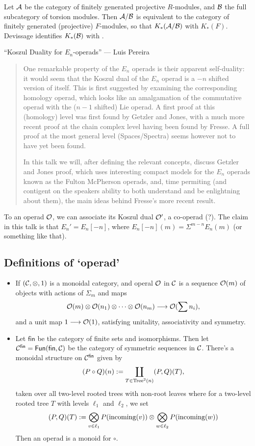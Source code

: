 \begin{InnaKTheory}
 Let $\mathcal{A}$ be the category of finitely generated projective $R$-modules, and $\mathcal{B}$ the full subcategory of torsion modules. Then $\mathcal{A}/\mathcal{B}$ is equivalent to the category of finitely generated (projective) $F$-modules, so that $K_*(\mathcal{A}/\mathcal{B})$ with $K_*(F)$. Devissage identifies $K_*(\mathcal{B})$ with .






\pagebreak
\end{InnaKTheory}
\begin{LuisKoszulDuality}
\KanSemResponse
{``Koszul Duality for $E_n$-operads'' --- Luis Pereira}
\begin{abstract}
One remarkable property of the $E_n$ operads is their apparent self-duality: it would seem that the Koszul dual of the $E_n$ operad is a $-n$ shifted version of itself. This is first suggested by examining the corresponding homology operad, which looks like an amalgamation of the commutative operad with the ($n-1$ shifted) Lie operad. A first proof at this (homology) level was first found by Getzler and Jones, with a much more recent proof at the chain complex level having been found by Fresse. A full proof at the most general level (Spaces/Spectra) seems however not to have yet been found.

 
In this talk we will, after defining the relevant concepts, discuss Getzler and Jones proof, which uses interesting compact models for the $E_n$ operads known as the Fulton McPherson operads, and, time permiting (and contigent on the speakers ability to both understand and be enlightning about them), the main ideas behind Fresse's more recent result.
\end{abstract}
To an operad $\mathcal{O}$, we can associate its Koszul dual $\mathcal{O}'$, a co-operad (?). The claim in this talk is that $E_n'=E_n[-n]$, where $E_n[-n](m)=\Sigma^{m-n}E_n(m)$ (or something like that).
\subsection*{Definitions of `operad'}
\begin{itemize}\squishlist
\item If $(\mathcal{C},\otimes,1)$ is a monoidal category, and operal $\mathcal{O}$ in $\mathcal{C}$ is a sequence $\mathcal{O}(m)$ of objects with actions of $\Sigma_m$ and maps
\[\mathcal{O}(m)\otimes\mathcal{O}(n_1)\otimes\cdots\otimes\mathcal{O}(n_m)\longrightarrow\mathcal{O}(\sum n_i),\]
and a unit map $1\longrightarrow\mathcal{O}(1)$, satisfying unitality, associativity and symmetry.
\item 
Let $\mathsf{fin}$ be the category of finite sets and isomorphisms. Then let $\mathcal{C}^{\mathsf{fin}}=\operatorname{{\mathsf{Fun}}}(\mathsf{fin},\mathcal{C})$ be the category of symmetric sequences in $\mathcal{C}$. There's a monoidal structure on $\mathcal{C}^{\mathsf{fin}}$ given by
\[(P\circ Q)(n):=\coprod_{T\in\textup{Tree}^2(n)}(P,Q)(T),\]
taken over all two-level rooted trees with non-root leaves 
where for a two-level rooted tree $T$ with levels $\ell_1$ and $\ell_2$, we set \[(P,Q)(T):=\bigotimes_{v\in\ell_1}P(\textup{incoming}(v))\otimes\bigotimes_{w\in\ell_2}P(\textup{incoming}(w))\]
Then an operad is a monoid for $\circ$.


\end{itemize}
\end{LuisKoszulDuality}
